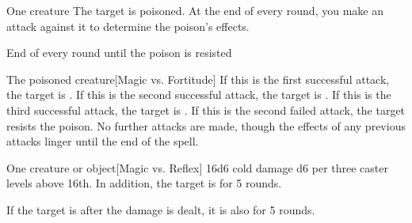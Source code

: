 \begin{spellheader}
    \spellrng{\rngclose}
\end{spellheader}
\begin{spelleffects}
    \begin{spelltarget}{One creature}
        \spelleffect The target is poisoned. At the end of every round, you make an attack against it to determine the poison's effects.
    \end{spelltarget}
    \begin{spelltrigger}{End of every round until the poison is resisted}
        \begin{spelltarget}{The poisoned creature}[Magic vs. Fortitude]
            \spellsuccess If this is the first successful attack, the target is \sickened. If this is the second successful attack, the target is \staggered. If this is the third successful attack, the target is \paralyzed.
            \spellfailure If this is the second failed attack, the target resists the poison. No further attacks are made, though the effects of any previous attacks linger until the end of the spell.
        \end{spelltarget}
    \end{spelltrigger}
\end{spelleffects}
\begin{spellfooter}
    
\end{spellfooter}

\begin{spellheader}
    \spellrng{\rngclose}
\end{spellheader}
\begin{spelleffects}
    \begin{spelltarget}{One creature or object}[Magic vs. Reflex]
        \spellsuccess 16d6 cold damage \add d6 per three caster levels above 16th. In addition, the target is \slowed for 5 rounds.

        If the target is \bloodied after the damage is dealt, it is also \paralyzed for 5 rounds.
    \end{spelltarget}
\end{spelleffects}
\begin{spellfooter}
    
\end{spellfooter}

